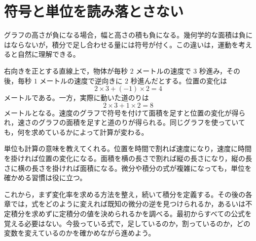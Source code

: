 \section{符号と単位を読み落とさない}
グラフの高さが負になる場合，幅と高さの積も負になる。幾何学的な面積は負にはならないが，積分で足し合わせる量には符号が付く。この違いは，運動を考えると自然に理解できる。

右向きを正とする直線上で，物体が毎秒 $2$ メートルの速度で $3$ 秒進み，その後，毎秒 $1$ メートルの速度で逆向きに $2$ 秒進んだとする。位置の変化は
\[
 2\times3+(-1)\times2=4
\]
メートルである。一方，実際に動いた道のりは
\[
 2\times3+1\times2=8
\]
メートルとなる。速度のグラフで符号を付けて面積を足すと位置の変化が得られ，速さのグラフの面積を足すと道のりが得られる。同じグラフを使っていても，何を求めているかによって計算が変わる。

単位も計算の意味を教えてくれる。位置を時間で割れば速度になり，速度に時間を掛ければ位置の変化になる。面積を横の長さで割れば縦の長さになり，縦の長さに横の長さを掛ければ面積になる。微分や積分の式が複雑になっても，単位を確かめる習慣は役に立つ。

これから，まず変化率を求める方法を整え，続いて積分を定義する。その後の各章では，式をどのように変えれば既知の微分の逆を見つけられるか，あるいは不定積分を求めずに定積分の値を決められるかを調べる。最初からすべての公式を覚える必要はない。今扱っている式で，足しているのか，割っているのか，どの変数を変えているのかを確かめながら進めよう。

